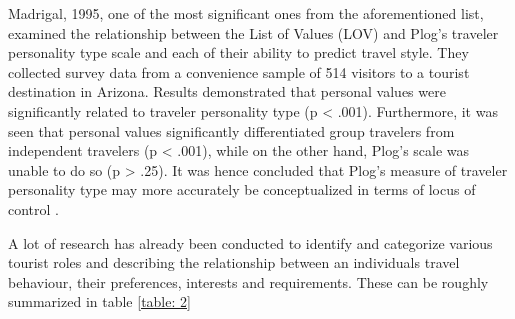 Madrigal, 1995, one of the most significant ones from the aforementioned list, examined the relationship between the List of Values (LOV) and Plog's traveler personality type scale and each of their ability to predict travel style. They collected survey data from a convenience sample of 514 visitors to a tourist destination in Arizona. Results demonstrated that personal values were significantly related to traveler personality type (p < .001). Furthermore, it was seen that personal values significantly differentiated group travelers from independent travelers (p < .001), while on the other hand, Plog's scale was unable to do so (p > .25). It was hence concluded that Plog's measure of traveler personality type may more accurately be conceptualized in terms of locus of control \cite{madrigal1995personal}.


A lot of research has already been conducted to identify and categorize various tourist roles and describing the relationship between an individual\textquotesingle s travel behaviour, their preferences, interests and requirements. These can be roughly summarized in table \ref{table: 2}

